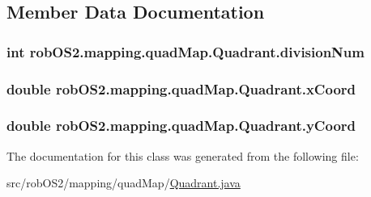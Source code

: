 \subsection{Member Data Documentation}
\hypertarget{classrob_o_s2_1_1mapping_1_1quad_map_1_1_quadrant_aec915a37f3de7b2e0d4aa9463d516605}{
\subsubsection[{divisionNum}]{\setlength{\rightskip}{0pt plus 5cm}int {\bf robOS2.mapping.quadMap.Quadrant.divisionNum}}}
\label{classrob_o_s2_1_1mapping_1_1quad_map_1_1_quadrant_aec915a37f3de7b2e0d4aa9463d516605}
\hypertarget{classrob_o_s2_1_1mapping_1_1quad_map_1_1_quadrant_a6ae260d1c505d262b0a6ce3a9807f8a3}{
\subsubsection[{xCoord}]{\setlength{\rightskip}{0pt plus 5cm}double {\bf robOS2.mapping.quadMap.Quadrant.xCoord}}}
\label{classrob_o_s2_1_1mapping_1_1quad_map_1_1_quadrant_a6ae260d1c505d262b0a6ce3a9807f8a3}
\hypertarget{classrob_o_s2_1_1mapping_1_1quad_map_1_1_quadrant_aa8eb1e2a9809842c04c93fd111db44d3}{
\subsubsection[{yCoord}]{\setlength{\rightskip}{0pt plus 5cm}double {\bf robOS2.mapping.quadMap.Quadrant.yCoord}}}
\label{classrob_o_s2_1_1mapping_1_1quad_map_1_1_quadrant_aa8eb1e2a9809842c04c93fd111db44d3}


The documentation for this class was generated from the following file:\begin{DoxyCompactItemize}
\item 
src/robOS2/mapping/quadMap/\hyperlink{_quadrant_8java}{Quadrant.java}\end{DoxyCompactItemize}
